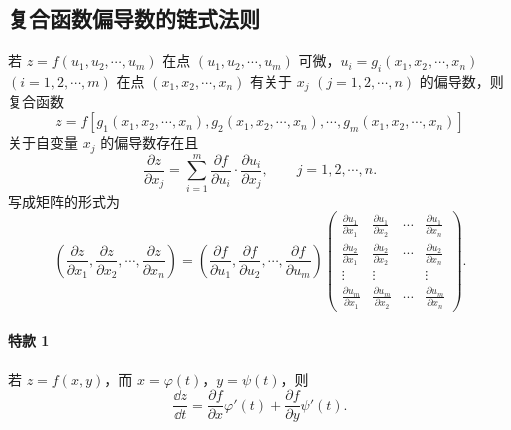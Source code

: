 \subsection{复合函数偏导数的链式法则}

若 $z=f(u_1,u_2,\cdots,u_m)$ 在点 $(u_1,u_2,\cdots,u_m)$ 可微，$u_i=g_i(x_1,x_2,\cdots,x_n)$ $(i=1,2,\cdots,m)$ 在点 $(x_1,x_2,\cdots,x_n)$ 有关于 $x_j$ $(j=1,2,\cdots,n)$ 的偏导数，则复合函数
\[
  z=f[g_1(x_1,x_2,\cdots,x_n),g_2(x_1,x_2,\cdots,x_n),\cdots,g_m(x_1,x_2,\cdots,x_n)]
\]
关于自变量 $x_j$ 的偏导数存在且
\begin{equation}
  \frac{\partial z}{\partial x_j}
  =\sum_{i=1}^m\frac{\partial f}{\partial u_i}\cdot\frac{\partial u_i}{\partial x_j},
  \qquad j=1,2,\cdots,n.
  \tag{19.2}
  \label{eq:19.2}
\end{equation}
写成矩阵的形式为
\[
  \left(\frac{\partial z}{\partial x_1},\frac{\partial z}{\partial x_2},\cdots,\frac{\partial z}{\partial x_n}\right)
  =\left(\frac{\partial f}{\partial u_1},\frac{\partial f}{\partial u_2},\cdots,\frac{\partial f}{\partial u_m}\right)
  \begin{pmatrix}
    \frac{\partial u_1}{\partial x_1} & \frac{\partial u_1}{\partial x_2} & \cdots & \frac{\partial u_1}{\partial x_n}\\
    \frac{\partial u_2}{\partial x_1} & \frac{\partial u_2}{\partial x_2} & \cdots & \frac{\partial u_2}{\partial x_n}\\
    \vdots & \vdots & & \vdots\\
    \frac{\partial u_m}{\partial x_1} & \frac{\partial u_m}{\partial x_2} & \cdots & \frac{\partial u_m}{\partial x_n}
  \end{pmatrix}.
\]

\paragraph{特款 1}
若 $z=f(x,y)$，而 $x=\varphi(t)$，$y=\psi(t)$，则
\begin{equation}
  \frac{\dd z}{\dd t}=\frac{\partial f}{\partial x}\varphi'(t)+\frac{\partial f}{\partial y}\psi'(t).
  \tag{19.3}
  \label{eq:19.3}
\end{equation}

